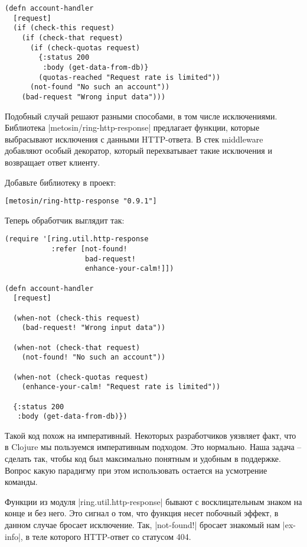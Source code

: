 \begin{verbatim}
(defn account-handler
  [request]
  (if (check-this request)
    (if (check-that request)
      (if (check-quotas request)
        {:status 200
         :body (get-data-from-db)}
        (quotas-reached "Request rate is limited"))
      (not-found "No such an account"))
    (bad-request "Wrong input data")))
\end{verbatim}

Подобный случай решают разными способами, в том числе исключениями. Библиотека
\spverb|metosin/ring-http-response| предлагает функции, которые выбрасывают исключения
с данными HTTP-ответа. В стек middleware добавляют особый декоратор, который
перехватывает такие исключения и возвращает ответ клиенту.

Добавьте библиотеку в проект:

\begin{verbatim}
[metosin/ring-http-response "0.9.1"]
\end{verbatim}

Теперь обработчик выглядит так:

\begin{verbatim}
(require '[ring.util.http-response
           :refer [not-found!
                   bad-request!
                   enhance-your-calm!]])

(defn account-handler
  [request]

  (when-not (check-this request)
    (bad-request! "Wrong input data"))

  (when-not (check-that request)
    (not-found! "No such an account"))

  (when-not (check-quotas request)
    (enhance-your-calm! "Request rate is limited"))

  {:status 200
   :body (get-data-from-db)})
\end{verbatim}

Такой код похож на императивный. Некоторых разработчиков уязвляет факт, что в
Clojure мы пользуемся императивным подходом. Это нормально. Наша задача --
сделать так, чтобы код был максимально понятным и удобным в поддержке. Вопрос
какую парадигму при этом использовать остается на усмотрение команды.

Функции из модуля \spverb|ring.util.http-response| бывают с восклицательным знаком на
конце и без него. Это сигнал о том, что функция несет побочный эффект, в данном
случае бросает исключение. Так, \spverb|not-found!| бросает знакомый нам \spverb|ex-info|, в
теле которого HTTP-ответ со статусом 404.

